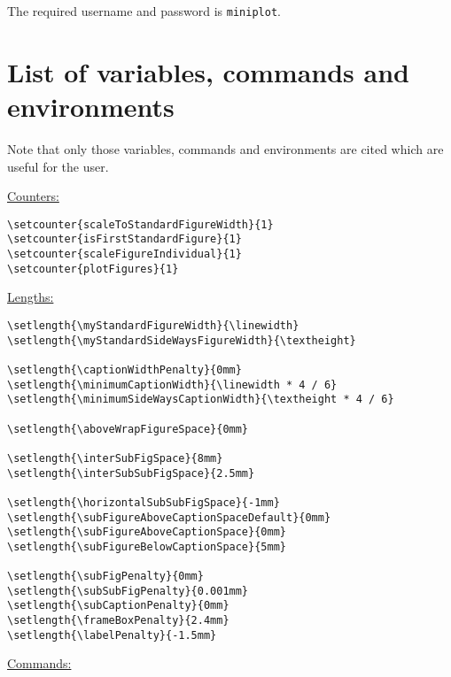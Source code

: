 \documentclass[12pt,a4paper]{article}
\newcommand{\comm}[1]{\texttt{#1}}
\begin{document}
The required username and password is \comm{miniplot}.







\section{List of variables, commands and environments}


Note that only those variables, commands and environments are cited which
are useful for the user.


\bigskip\bigskip

\underline{Counters:}

\begin{verbatim}
\setcounter{scaleToStandardFigureWidth}{1}
\setcounter{isFirstStandardFigure}{1}
\setcounter{scaleFigureIndividual}{1}
\setcounter{plotFigures}{1}
\end{verbatim}



\bigskip\bigskip

\underline{Lengths:}

\begin{verbatim}
\setlength{\myStandardFigureWidth}{\linewidth}
\setlength{\myStandardSideWaysFigureWidth}{\textheight}

\setlength{\captionWidthPenalty}{0mm}
\setlength{\minimumCaptionWidth}{\linewidth * 4 / 6}
\setlength{\minimumSideWaysCaptionWidth}{\textheight * 4 / 6}

\setlength{\aboveWrapFigureSpace}{0mm}

\setlength{\interSubFigSpace}{8mm}
\setlength{\interSubSubFigSpace}{2.5mm}

\setlength{\horizontalSubSubFigSpace}{-1mm}
\setlength{\subFigureAboveCaptionSpaceDefault}{0mm}
\setlength{\subFigureAboveCaptionSpace}{0mm}
\setlength{\subFigureBelowCaptionSpace}{5mm}

\setlength{\subFigPenalty}{0mm}
\setlength{\subSubFigPenalty}{0.001mm}
\setlength{\subCaptionPenalty}{0mm}
\setlength{\frameBoxPenalty}{2.4mm}
\setlength{\labelPenalty}{-1.5mm}
\end{verbatim}



\bigskip\bigskip

\underline{Commands:}
\end{document}

